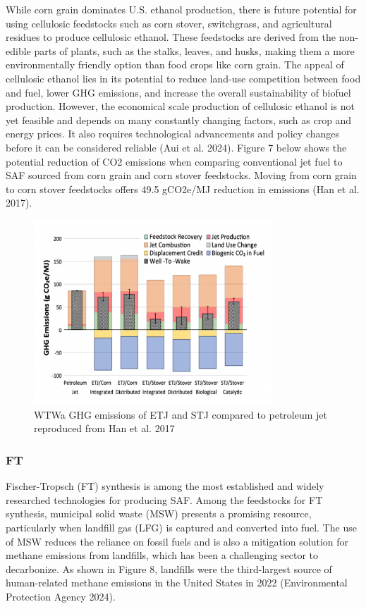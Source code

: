\documentclass[12pt]{article}
\begin{document}
\begin{Appendix}
 While corn grain dominates U.S. ethanol production, there is future potential for using cellulosic feedstocks such as corn stover, switchgrass, and agricultural residues to produce cellulosic ethanol. These feedstocks are derived from the non-edible parts of plants, such as the stalks, leaves, and husks, making them a more environmentally friendly option than food crops like corn grain. The appeal of cellulosic ethanol lies in its potential to reduce land-use competition between food and fuel, lower GHG emissions, and increase the overall sustainability of biofuel production. However, the economical scale production of cellulosic ethanol is not yet feasible and depends on many constantly changing factors, such as crop and energy prices. It also requires technological advancements and policy changes before it can be considered reliable (Aui et al. 2024). Figure 7 below shows the potential reduction of CO2 emissions when comparing conventional jet fuel to SAF sourced from corn grain and corn stover feedstocks. Moving from corn grain to corn stover feedstocks offers 49.5 gCO2e/MJ reduction in emissions (Han et al. 2017). 

\begin{figure}[H]
\centering
\includegraphics[width=0.8\textwidth]{Fig 7.png} %
\caption{WTWa GHG emissions of ETJ and STJ compared to petroleum jet reproduced from Han et al. 2017}
\label{fig:figure 7}
\end{figure}
 
\subsubsection{FT}

Fischer-Tropsch (FT) synthesis is among the most established and widely researched technologies for producing SAF. Among the feedstocks for FT synthesis, municipal solid waste (MSW) presents a promising resource, particularly when landfill gas (LFG) is captured and converted into fuel. The use of MSW reduces the reliance on fossil fuels and is also a mitigation solution for methane emissions from landfills, which has been a challenging sector to decarbonize. As shown in Figure 8, landfills were the third-largest source of human-related methane emissions in the United States in 2022 (Environmental Protection Agency 2024).


\end{Appendix}
\end{document}
